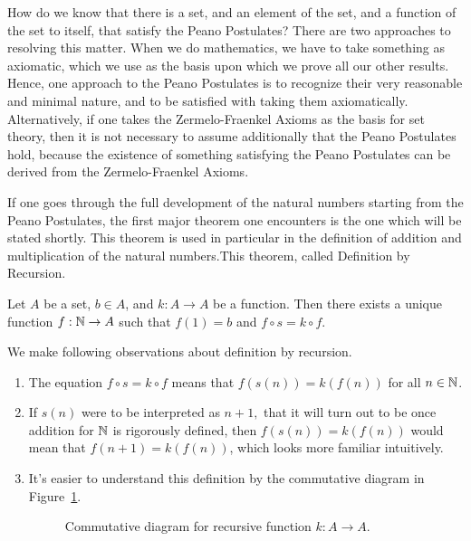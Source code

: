 \documentclass[a4paper,english,12pt]{article}
\begin{document}
How do we know that there is a set, and an element of the set, and a function of the set to itself, that satisfy the Peano Postulates? There are two approaches to resolving this matter. When we do mathematics, we have to take something as axiomatic, which we use as the basis upon which we prove all our other results. Hence, one approach to the Peano Postulates is to recognize their very reasonable and minimal nature, and to be satisfied with taking them axiomatically. Alternatively, if one takes the Zermelo-Fraenkel Axioms as the basis for set theory, then it is not necessary to assume additionally that the Peano Postulates hold, because the existence of something satisfying the Peano Postulates can be derived from the Zermelo-Fraenkel Axioms.

If one goes through the full development of the natural numbers starting from the Peano Postulates, the first major theorem one encounters is the one which will be stated shortly. This theorem is used in particular in the definition of addition and multiplication of the natural numbers.This theorem, called Definition by Recursion.

\begin{thm} Let $A$ be a set, $b\in A$, and $k:A \to A$ be a function. Then there exists a unique function $f:\mathbb{N}\to A$ such that $f(1)=b$ and $f \circ s = k \circ f$.
\end{thm}
\begin{rem} We make following observations about definition by recursion.
\begin{enumerate}
	\item The equation $f \circ s = k \circ f$ means that $f(s(n))=k(f(n))$ for all $n \in \mathbb{N}$. 
	\item If $s(n)$ were to be interpreted as $n+1,$ that it will turn out to be once addition for $\mathbb{N}$ is rigorously defined, then $f(s(n))=k(f(n))$ would mean that $f(n+1)=k(f(n))$, which looks more familiar intuitively.
	\item It's easier to understand this definition by the commutative diagram in Figure~\ref{Figure:DfnRcrsn}.
	\begin{figure}[hhhh]%
	\centering
		\scalebox{1.5}{}
	\caption{Commutative diagram for recursive function $k: A \to A$.}%
	\label{Figure:DfnRcrsn}%
	\end{figure}
\end{enumerate}

\end{rem}
\end{document}
